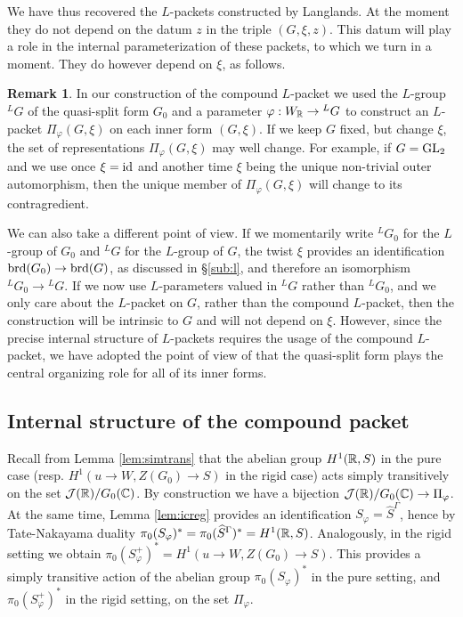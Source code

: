 \documentclass{article}
\theoremstyle{definition}
\newtheorem{rem}[thm]{Remark}
\numberwithin{equation}{section}
\renewcommand{\-}{\hyp{}}
\begin{document}
We have thus recovered the $L$\-packets constructed by Langlands. At the moment they do not depend on the datum $z$ in the triple $(G,\xi,z)$. This datum will play a role in the internal parameterization of these packets, to which we turn in a moment. They do however depend on $\xi$, as follows.

\begin{rem} \label{rem:depxi}
	In our construction of the compound $L$-packet we used the $L$-group $^LG$ of the quasi-split form $G_0$ and a parameter $\varphi : W_{\mathbb{R}} \to {^LG}$ to construct an $L$-packet $\Pi_\varphi(G,\xi)$ on each inner form $(G,\xi)$. If we keep $G$ fixed, but change $\xi$, the set of representations $\Pi_\varphi(G,\xi)$ may well change. For example, if $G=\textrm{GL}_2$ and we use once $\xi=\textrm{id}$ and another time $\xi$ being the unique non-trivial outer automorphism, then the unique member of $\Pi_\varphi(G,\xi)$ will change to its contragredient. 
	
	We can also take a different point of view. If we momentarily write $^LG_0$ for the $L$-group of $G_0$ and $^LG$ for the $L$-group of $G$, the twist $\xi$ provides an identification $\textrm{brd}(G_0) \to \textrm{brd}(G)$, as discussed in \S\ref{sub:l}, and therefore an isomorphism $^LG_0 \to {^LG}$. If we now use $L$-parameters valued in $^LG$ rather than $^LG_0$, and we only care about the $L$-packet on $G$, rather than the compound $L$-packet, then the construction will be intrinsic to $G$ and will not depend on $\xi$. However, since the precise internal structure of $L$-packets requires the usage of the compound $L$-packet, we have adopted the point of view of \cite{ABV92} that the quasi-split form plays the central organizing role for all of its inner forms.
\end{rem}

\subsection{Internal structure of the compound packet} \label{sub:intstr}


Recall from Lemma \ref{lem:simtrans} that the abelian group $H^1(\mathbb{R},S)$ in the pure case (resp. $H^1(u \to W,Z(G_0) \to S)$ in the rigid case) acts simply transitively on the set $\mathcal{J}(\mathbb{R})/G_0(\mathbb{C})$. By construction we have a bijection $\mathcal{J}(\mathbb{R})/G_0(\mathbb{C}) \to \Pi_\varphi$. At the same time, Lemma \ref{lem:icreg} provides an identification $S_\varphi = \hat S^\Gamma$, hence by Tate-Nakayama duality $\pi_0(S_\varphi)^*=\pi_0(\widehat S^\Gamma)^*=H^1(\mathbb{R},S)$. Analogously, in the rigid setting we obtain $\pi_0(S_\varphi^+)^*=H^1(u \to W,Z(G_0) \to S)$. This provides a simply transitive action of the abelian group $\pi_0(S_\varphi)^*$ in the pure setting, and $\pi_0(S_\varphi^+)^*$ in the rigid setting, on the set $\Pi_\varphi$.
\end{document}
